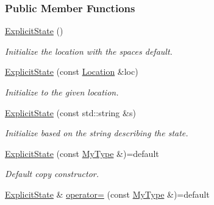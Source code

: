 \subsubsection*{Public Member Functions}
\begin{DoxyCompactItemize}
\item 
\hyperlink{structslb_1_1core_1_1sb_1_1ExplicitState_a8d4e4a73d0760f49b275e2661f759fcf}{Explicit\+State} ()\hypertarget{structslb_1_1core_1_1sb_1_1ExplicitState_a8d4e4a73d0760f49b275e2661f759fcf}{}\label{structslb_1_1core_1_1sb_1_1ExplicitState_a8d4e4a73d0760f49b275e2661f759fcf}

\begin{DoxyCompactList}\small\item\em Initialize the location with the space\textquotesingle{}s default. \end{DoxyCompactList}\item 
\hyperlink{structslb_1_1core_1_1sb_1_1ExplicitState_abb5dc932345986e03ba3afae41408086}{Explicit\+State} (const \hyperlink{structslb_1_1core_1_1sb_1_1ExplicitState_a0db984d44f46c477a6df3c9b062925f9}{Location} \&loc)
\begin{DoxyCompactList}\small\item\em Initialize to the given location. \end{DoxyCompactList}\item 
\hyperlink{structslb_1_1core_1_1sb_1_1ExplicitState_a9ba10a1c18e845a63ac6aa5b5669adde}{Explicit\+State} (const std\+::string \&s)
\begin{DoxyCompactList}\small\item\em Initialize based on the string describing the state. \end{DoxyCompactList}\item 
\hyperlink{structslb_1_1core_1_1sb_1_1ExplicitState_a269a858c6fcf90f39f363326c5a977de}{Explicit\+State} (const \hyperlink{structslb_1_1core_1_1sb_1_1ExplicitState_ac92f2c174f45d0fd4276916906b4e8b7}{My\+Type} \&)=default\hypertarget{structslb_1_1core_1_1sb_1_1ExplicitState_a269a858c6fcf90f39f363326c5a977de}{}\label{structslb_1_1core_1_1sb_1_1ExplicitState_a269a858c6fcf90f39f363326c5a977de}

\begin{DoxyCompactList}\small\item\em Default copy constructor. \end{DoxyCompactList}\item 
\hyperlink{structslb_1_1core_1_1sb_1_1ExplicitState}{Explicit\+State} \& \hyperlink{structslb_1_1core_1_1sb_1_1ExplicitState_a6193bf706a682ba07f80aef31c419875}{operator=} (const \hyperlink{structslb_1_1core_1_1sb_1_1ExplicitState_ac92f2c174f45d0fd4276916906b4e8b7}{My\+Type} \&)=default\hypertarget{structslb_1_1core_1_1sb_1_1ExplicitState_a6193bf706a682ba07f80aef31c419875}{}\label{structslb_1_1core_1_1sb_1_1ExplicitState_a6193bf706a682ba07f80aef31c419875}


\end{DoxyCompactItemize}
